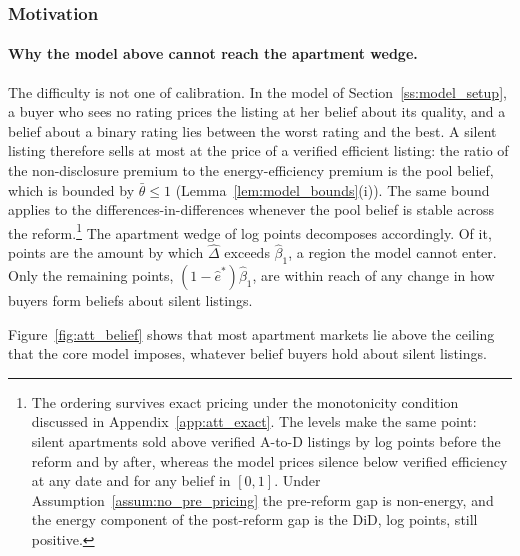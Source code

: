 \subsubsection{Motivation}
\label{ss:att_motivation}

\paragraph{Why the model above cannot reach the apartment wedge.}
The difficulty is not one of calibration. In the model of Section~\ref{ss:model_setup}, a buyer who sees no rating prices the listing at her belief about its quality, and a belief about a binary rating lies between the worst rating and the best. A silent listing therefore sells at most at the price of a verified efficient listing: the ratio of the non-disclosure premium to the energy-efficiency premium is the pool belief, which is bounded by $\bar\theta\le1$ (Lemma~\ref{lem:model_bounds}(i)). The same bound applies to the differences-in-differences whenever the pool belief is stable across the reform.\footnote{The ordering survives exact pricing under the monotonicity condition discussed in Appendix~\ref{app:att_exact}. The levels make the same point: silent apartments sold above verified A-to-D listings by \attLevelGapPreApt{} log points before the reform and by \attLevelGapPostApt{} after, whereas the model prices silence below verified efficiency at any date and for any belief in $[0,1]$. Under Assumption~\ref{assum:no_pre_pricing} the pre-reform gap is non-energy, and the energy component of the post-reform gap is the DiD, \attExcessApt{} log points, still positive.} The apartment wedge of \attLamApt{} log points decomposes accordingly. Of it, \attExcessApt{} points are the amount by which $\hat\Delta$ exceeds $\hat\beta_1$, a region the model cannot enter. Only the remaining \attReachApt{} points, $(1-\hat e^*)\hat\beta_1$, are within reach of any change in how buyers form beliefs about silent listings.

Figure~\ref{fig:att_belief} shows that most apartment markets lie above the ceiling that the core model imposes, whatever belief buyers hold about silent listings.


